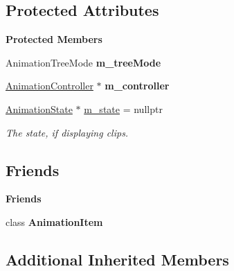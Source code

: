 \subsection*{Protected Attributes}
\begin{Indent}\textbf{ Protected Members}\par
\begin{DoxyCompactItemize}
\item 
\mbox{\label{classrev_1_1_view_1_1_animation_tree_widget_a4b03f340c440729548808295718868a4}} 
Animation\+Tree\+Mode {\bfseries m\+\_\+tree\+Mode}
\item 
\mbox{\label{classrev_1_1_view_1_1_animation_tree_widget_af4b2d2bbf62b33b162b38527cb49d859}} 
\mbox{\hyperlink{classrev_1_1_animation_controller}{Animation\+Controller}} $\ast$ {\bfseries m\+\_\+controller}
\item 
\mbox{\label{classrev_1_1_view_1_1_animation_tree_widget_a8f8868dae4ea9e94fc82c506032f0a93}} 
\mbox{\hyperlink{classrev_1_1_animation_state}{Animation\+State}} $\ast$ \mbox{\hyperlink{classrev_1_1_view_1_1_animation_tree_widget_a8f8868dae4ea9e94fc82c506032f0a93}{m\+\_\+state}} = nullptr
\begin{DoxyCompactList}\small\item\em The state, if displaying clips. \end{DoxyCompactList}\end{DoxyCompactItemize}
\end{Indent}
\subsection*{Friends}
\begin{Indent}\textbf{ Friends}\par
\begin{DoxyCompactItemize}
\item 
\mbox{\label{classrev_1_1_view_1_1_animation_tree_widget_a190e011cae65ba50e5259ddb7cae2b94}} 
class {\bfseries Animation\+Item}
\end{DoxyCompactItemize}
\end{Indent}
\subsection*{Additional Inherited Members}


